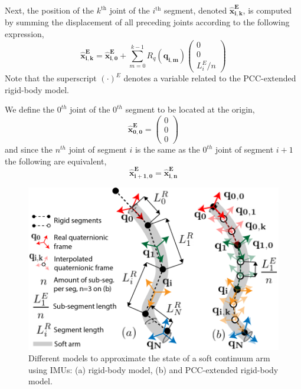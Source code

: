 Next, the position of the $k^\text{th}$ joint of the $i^\text{th}$ segment, denoted $\mathbf{\hat{x}_{i,k}^E}$, is computed by summing the displacement of all preceding joints according to the following expression,
\begin{equation}
    \mathbf{\hat{x}_{i,k}^{E}} = \mathbf{\hat{x}_{i,0}^{E}} + \sum_{m=0}^{k-1} R_q(\mathbf{q_{i,m}})\begin{pmatrix} 0 \\0 \\  L^E_i/n \end{pmatrix} 
\end{equation}
Note that the superscript $(\cdot)^E$ denotes a variable related to the PCC-extended rigid-body model.
%

We define the $0^{th}$ joint of the $0^{th}$ segment to be located at the origin,
%
\begin{equation}
     \mathbf{\hat{x}_{0,0}^{E}} = \begin{pmatrix} 0 \\0 \\  0 \end{pmatrix} 
\end{equation}
and since the $n^{th}$ joint of segment $i$ is the same as the $0^{th}$ joint of segment $i+1$ the following are equivalent, 
%
\begin{equation}
   \mathbf{ \hat{x}_{i+1,0}^{E}} = \mathbf{\hat{x}_{i,n}^{E}}
\end{equation}
%


\begin{figure}
    \centering
    \includegraphics[width=\linewidth]{fig/models2.png}
    \caption{Different models to approximate the state of a soft continuum arm using IMUs: (a) rigid-body model, (b) and PCC-extended rigid-body model.}
    \label{models}
\end{figure}
